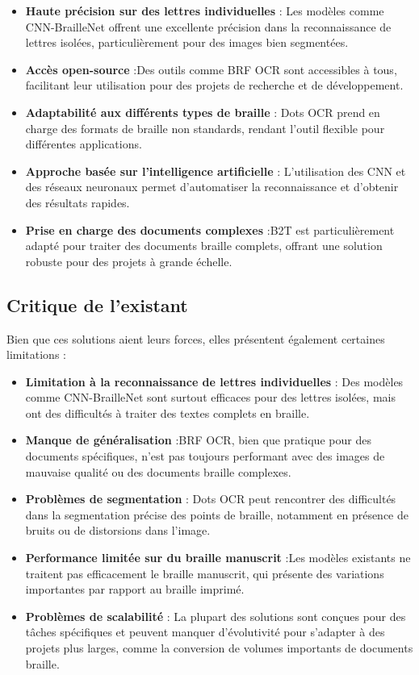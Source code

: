 \begin{itemize}
    \item \textbf{Haute précision sur des lettres individuelles } : Les modèles comme CNN-BrailleNet offrent une excellente précision dans la reconnaissance de lettres isolées, particulièrement pour des images bien segmentées. 
    \item \textbf{Accès open-source } :Des outils comme BRF OCR sont accessibles à tous, facilitant leur utilisation pour des projets de recherche et de développement. 
    \item \textbf{Adaptabilité aux différents types de braille } : Dots OCR prend en charge des formats de braille non standards, rendant l'outil flexible pour différentes applications. 
    \item \textbf{Approche basée sur l'intelligence artificielle } : L'utilisation des CNN et des réseaux neuronaux permet d'automatiser la reconnaissance et d'obtenir des résultats rapides.
    \item \textbf{Prise en charge des documents complexes } :B2T est particulièrement adapté pour traiter des documents braille complets, offrant une solution robuste pour des projets à grande échelle.  

\end{itemize}

\subsection{Critique de l'existant}

Bien que ces solutions aient leurs forces, elles présentent également certaines limitations : 

\begin{itemize}
    \item \textbf{Limitation à la reconnaissance de lettres individuelles } : Des modèles comme CNN-BrailleNet sont surtout efficaces pour des lettres isolées, mais ont des difficultés à traiter des textes complets en braille. 
    \item \textbf{Manque de généralisation } :BRF OCR, bien que pratique pour des documents spécifiques, n'est pas toujours performant avec des images de mauvaise qualité ou des documents braille complexes. 
    \item \textbf{Problèmes de segmentation } : Dots OCR peut rencontrer des difficultés dans la segmentation précise des points de braille, notamment en présence de bruits ou de distorsions dans l'image.  
    \item \textbf{Performance limitée sur du braille manuscrit } :Les modèles existants ne traitent pas efficacement le braille manuscrit, qui présente des variations importantes par rapport au braille imprimé. 
    \item \textbf{Problèmes de scalabilité } : La plupart des solutions sont conçues pour des tâches spécifiques et peuvent manquer d'évolutivité pour s'adapter à des projets plus larges, comme la conversion de volumes importants de documents braille.  

\end{itemize}


